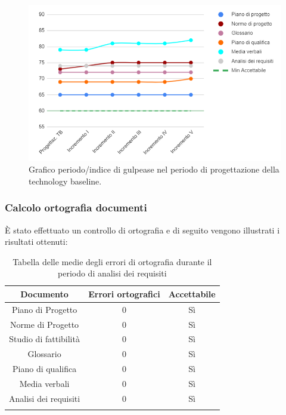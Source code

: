 \begin{figure}[H]
	\centering
	\includegraphics[width=0.8\linewidth]{./res/images/gulpease_2.png}
	\caption{Grafico periodo/indice di gulpease nel periodo di progettazione della technology baseline.}
	\label{fig:Grafico indice di gulpease periodo di progettazione della technology baseline.}
\end{figure}

\subsubsection{Calcolo ortografia documenti}
È stato effettuato un controllo di ortografia e di seguito vengono illustrati i risultati ottenuti:

\begin{center}
	\begin{longtable}{|c|c|c|}
	\hline
	\rowcolor{lighter-grayer}
	\textbf{Documento} & \textbf{Errori ortografici} & \textbf{Accettabile} \\
	\hline
	\endfirsthead

	\hline
	Piano di Progetto & 0 & Sì \\
	\hline
	\hline
	Norme di Progetto &  0 & Sì \\
	\hline
	\hline
	Studio di fattibilità & 0 & Sì \\
	\hline
	\hline
	Glossario & 0 & Sì \\
	\hline
	\hline
	Piano di qualifica & 0 & Sì \\
	\hline
	\hline
	Media verbali & 0 & Sì \\
	\hline
	\hline
	Analisi dei requisiti & 0 & Sì \\
	\hline
	\caption{Tabella delle medie degli errori di ortografia durante il periodo di analisi dei requisiti}
	\end{longtable}
\end{center}

